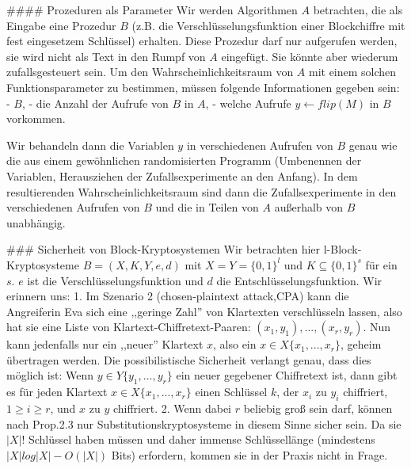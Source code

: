 \documentclass[a4paper]{article}
\begin{document}
\begin{multicols}{3}
#### Prozeduren als Parameter
Wir werden Algorithmen $A$ betrachten, die als Eingabe eine Prozedur $B$ (z.B. die Verschlüsselungsfunktion einer Blockchiffre mit fest eingesetzem Schlüssel) erhalten. Diese Prozedur darf nur aufgerufen werden, sie wird nicht als Text in den Rumpf von $A$ eingefügt. Sie könnte aber wiederum zufallsgesteuert sein. Um den Wahrscheinlichkeitsraum von $A$ mit einem solchen Funktionsparameter zu bestimmen, müssen folgende Informationen gegeben sein:
- $B$,
- die Anzahl der Aufrufe von $B$ in $A$,
- welche Aufrufe $y\leftarrow flip(M)$ in $B$ vorkommen.

Wir behandeln dann die Variablen $y$ in verschiedenen Aufrufen von $B$ genau wie die aus einem gewöhnlichen randomisierten Programm (Umbenennen der Variablen, Herausziehen der Zufallsexperimente an den Anfang). In dem resultierenden Wahrscheinlichkeitsraum sind dann die Zufallsexperimente in den verschiedenen Aufrufen von $B$ und die in Teilen von $A$ außerhalb von $B$ unabhängig.

### Sicherheit von Block-Kryptosystemen
Wir betrachten hier l-Block-Kryptosysteme $B=(X,K,Y,e,d)$ mit $X=Y=\{0,1\}^l$ und $K\subseteq\{0,1\}^s$ für ein $s$. $e$ ist die Verschlüsselungsfunktion und $d$ die Entschlüsselungsfunktion. Wir erinnern uns:
1. Im Szenario 2 (chosen-plaintext attack,CPA) kann die Angreiferin Eva sich eine ,,geringe Zahl'' von Klartexten verschlüsseln lassen, also hat sie eine Liste von Klartext-Chiffretext-Paaren: $(x_1,y_1),...,(x_r,y_r)$. Nun kann jedenfalls nur ein ,,neuer'' Klartext $x$, also ein $x\in X\{x_1,...,x_r\}$, geheim übertragen werden. Die possibilistische Sicherheit verlangt genau, dass dies möglich ist: Wenn $y\in Y\{y_1,...,y_r\}$ ein neuer gegebener Chiffretext ist, dann gibt es für jeden Klartext $x\in X\{x_1,...,x_r\}$ einen Schlüssel $k$, der $x_i$ zu $y_i$ chiffriert, $1 \geq i\geq r$, und $x$ zu $y$ chiffriert.
2. Wenn dabei $r$ beliebig groß sein darf, können nach Prop.2.3 nur Substitutionskryptosysteme in diesem Sinne sicher sein. Da sie $|X|!$ Schlüssel haben müssen und daher immense Schlüssellänge (mindestens $|X|log|X|-O(|X|)$ Bits) erfordern, kommen sie in der Praxis nicht in Frage.


\end{multicols}
\end{document}
